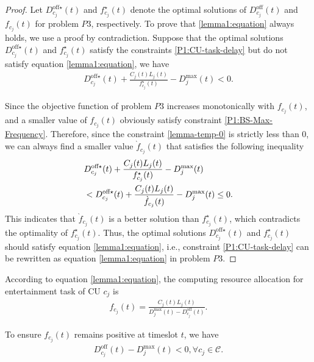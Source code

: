 \documentclass[10pt,journal,compsoc]{IEEEtran}
\newtheorem*{proof}{Proof}
\begin{document}
\begin{proof}
    Let ${D}_{c_{j}}^{\text{off} \star}(t)$ and ${f}^{\star}_{c_{j}}(t)$ denote the optimal solutions of $D_{c_{j}}^{\text{off}}(t)$ and $f_{c_{j}}(t)$ for problem $P3$, respectively. 
    To prove that \eqref{lemma1:equation} always holds, we use a proof by contradiction. 
    Suppose that the optimal solutions ${D}_{c_{j}}^{\text{off} \star}(t)$ and $f^{\star}_{c_{j}}(t)$ satisfy the constraints \eqref{P1:CU-task-delay} but do not satisfy equation \eqref{lemma1:equation}, we have
    \begin{align}\label{lemma-temp-0}
       {D}_{c_{j}}^{\text{off} \star}(t) + \frac{C_{{j}}(t)L_{j}(t)}{{f}^{\star}_{c_{j}}(t)} - D^{\max}_{j}(t) < 0.
    \end{align}

    Since the objective function of problem $P3$ increases monotonically with $f_{c_{j}}(t)$, and a smaller value of $f_{c_{j}}(t)$ obviously satisfy constraint \eqref{P1:BS-Max-Frequency}. 
    Therefore, since the constraint \eqref{lemma-temp-0} is strictly less than $0$, we can always find a smaller value $\grave{f}_{c_{j}}(t)$ that satisfies the following inequality
    \begin{align}
        & {D}_{c_{j}}^{\text{off} \star}(t) + \frac{C_{{j}}(t)L_{j}(t)}{{f}^{\star}_{c_{j}}(t)} - D^{\max}_{j}(t) \notag \\
        & < {D}_{c_{j}}^{\text{off} \star}(t) + \frac{C_{{j}}(t)L_{j}(t)}{\grave{f}_{c_{j}}(t)} - D^{\max}_{j}(t) \le 0.
    \end{align}
    This indicates that $\grave{f}_{c_{j}}(t)$ is a better solution than ${f}^{\star}_{c_{j}}(t)$, which contradicts the optimality of ${f}^{\star}_{c_{j}}(t)$.
    Thus, the optimal solutions ${D}_{c_{j}}^{\text{off} \star}(t)$ and ${f}^{\star}_{c_{j}}(t)$ should satisfy equation \eqref{lemma1:equation}, i.e., constraint \eqref{P1:CU-task-delay} can be rewritten as equation \eqref{lemma1:equation} in problem $P3$.
\end{proof}

According to equation \eqref{lemma1:equation}, the computing resource allocation for entertainment task of CU $c_{j}$ is
\begin{align}\label{temp:CU-Frequency}
    f_{c_{j}}(t) = \frac{C_{{j}}(t)L_{j}(t)}{D_{{j}}^{\max}(t) - D_{c_{j}}^{\text{off}}(t)}.
\end{align}

To ensure $f_{c_{j}}(t)$ remains positive at timeslot $t$, we have
\begin{align}\label{P3:CU-Frequency-Always-Positive}
    D_{c_{j}}^{\text{off}}(t) - D_{{j}}^{\max}(t) < 0, \forall c_{j} \in \mathcal{C}.
\end{align}
\end{document}
